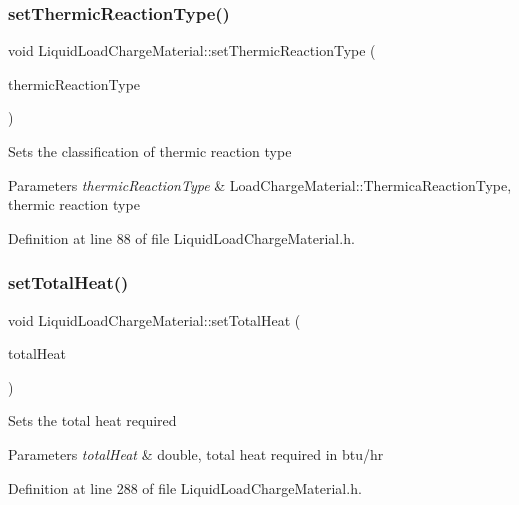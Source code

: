 \subsubsection{\texorpdfstring{set\+Thermic\+Reaction\+Type()}{setThermicReactionType()}}
{\footnotesize\ttfamily void Liquid\+Load\+Charge\+Material\+::set\+Thermic\+Reaction\+Type (\begin{DoxyParamCaption}\item[{\hyperlink{class_load_charge_material_a51d4263e865a5d86236622dd3fe23fd1}{Load\+Charge\+Material\+::\+Thermic\+Reaction\+Type}}]{thermic\+Reaction\+Type }\end{DoxyParamCaption})\hspace{0.3cm}{\ttfamily [inline]}}

Sets the classification of thermic reaction type 
\begin{DoxyParams}{Parameters}
{\em thermic\+Reaction\+Type} & Load\+Charge\+Material\+::\+Thermica\+Reaction\+Type, thermic reaction type \\
\hline
\end{DoxyParams}


Definition at line 88 of file Liquid\+Load\+Charge\+Material.\+h.

\mbox{\label{class_liquid_load_charge_material_ad45afc317b72c89cc46016e0b05b50b3}} 
\subsubsection{\texorpdfstring{set\+Total\+Heat()}{setTotalHeat()}}
{\footnotesize\ttfamily void Liquid\+Load\+Charge\+Material\+::set\+Total\+Heat (\begin{DoxyParamCaption}\item[{const double}]{total\+Heat }\end{DoxyParamCaption})\hspace{0.3cm}{\ttfamily [inline]}}

Sets the total heat required 
\begin{DoxyParams}{Parameters}
{\em total\+Heat} & double, total heat required in btu/hr \\
\hline
\end{DoxyParams}


Definition at line 288 of file Liquid\+Load\+Charge\+Material.\+h.

